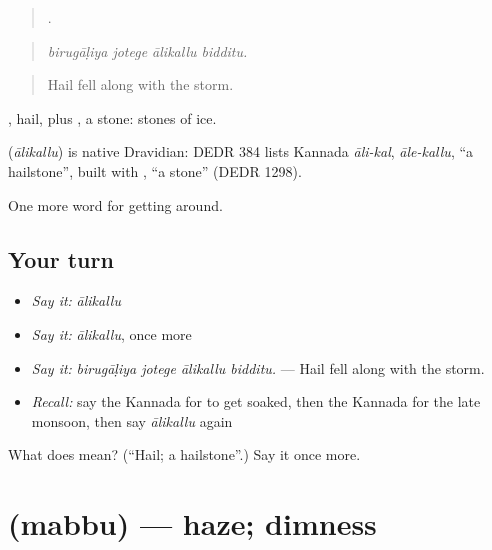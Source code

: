 \begin{quote}
   .
\end{quote}

\begin{quote}
\emph{birugāḷiya jotege ālikallu bidditu.}
\end{quote}

\begin{quote}
Hail fell along with the storm.
\end{quote}

, hail, plus , a stone: stones of ice.

\begin{cousinweb}
\textbf{} (\emph{ālikallu}) is native Dravidian: DEDR 384 lists Kannada \emph{āli-kal}, \emph{āle-kallu}, \textquotedblleft{}a hailstone\textquotedblright{}, built with , \textquotedblleft{}a stone\textquotedblright{} (DEDR 1298).
\end{cousinweb}

\begin{grammarlens}[title={What you've built}]
One more word for getting around.
\end{grammarlens}

\subsection*{Your turn}
\begin{itemize}
\raggedright
  \item \emph{Say it:} \emph{ālikallu}
  \item \emph{Say it:} \emph{ālikallu}, once more
  \item \emph{Say it:} \emph{birugāḷiya jotege ālikallu bidditu.} — Hail fell along with the storm.
  \item \emph{Recall:} say the Kannada for to get soaked, then the Kannada for the late monsoon, then say \emph{ālikallu} again
\end{itemize}

\begin{tcolorbox}[breakable,colback=teal!4,colframe=teal!35!black,title={Before you move on}]
What does  mean? (\textquotedblleft{}Hail; a hailstone\textquotedblright{}.) Say it once more.
\end{tcolorbox}
\section[\texorpdfstring{\kn{ಮಬ್ಬು} (mabbu)}{ಮಬ್ಬು (mabbu)}]{ (mabbu) — haze; dimness}


